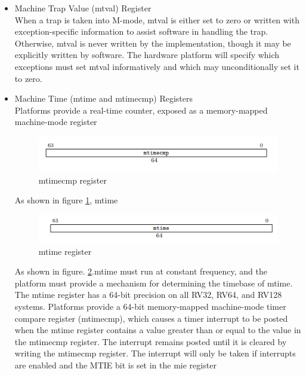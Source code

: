 \documentclass[../main.tex]{subfiles}
\begin{document}
\begin{itemize}
    \item Machine Trap Value (mtval) Register\\
        When a trap is taken into M-mode, mtval is either set to zero or written with exception-specific information to assist software in handling the trap. Otherwise, mtval is never written by the implementation, though it may be explicitly written by software. The hardware platform will specify which exceptions must set mtval informatively and which may unconditionally set it to zero.

    \item  Machine Time (mtime and mtimecmp) Registers\\
        Platforms provide a real-time counter, exposed as a memory-mapped machine-mode register
        \begin{figure}[h]
            \centering
            \includegraphics[width=10 cm]{diagrams/mtimecmp.PNG}
            \caption{mtimecmp register}
            \label{fig:mtimecmp}
        \end{figure}
        As shown in figure \ref{fig:mtimecmp}, mtime 
        \begin{figure}[h]
            \centering
            \includegraphics[width=10 cm]{diagrams/mtime.PNG}
            \caption{mtime register}
            \label{fig:mtime}
        \end{figure}
        
        As shown in figure. \ref{fig:mtime}.mtime must run at constant frequency, and the platform must provide a mechanism for determining the timebase of mtime. The mtime register has a 64-bit precision on all RV32, RV64, and RV128 systems. Platforms provide a 64-bit memory-mapped machine-mode timer compare register (mtimecmp), which causes a timer interrupt to be posted when the mtime register contains a value greater than or equal to the value in the mtimecmp register. The interrupt remains posted until it is cleared by writing the mtimecmp register. The interrupt will only be taken if interrupts are enabled and the MTIE bit is set in the mie register


\end{itemize}
\end{document}
